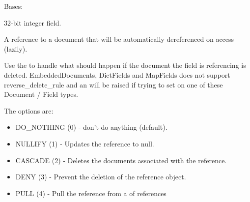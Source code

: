 \documentclass[letterpaper,10pt,english]{sphinxmanual}
\begin{document}
\begin{fulllineitems}
\label{\detokenize{questionnaire_response:questionnaire_response.QuestionnaireResponse}}
Bases: 

\begin{fulllineitems}
\label{\detokenize{questionnaire_response:questionnaire_response.QuestionnaireResponse.answer}}
32-bit integer field.

\end{fulllineitems}


\begin{fulllineitems}
\label{\detokenize{questionnaire_response:questionnaire_response.QuestionnaireResponse.questionnaire_item}}
A reference to a document that will be automatically dereferenced on
access (lazily).

Use the  to handle what should happen if the document
the field is referencing is deleted.  EmbeddedDocuments, DictFields and
MapFields does not support reverse\_delete\_rule and an 
will be raised if trying to set on one of these Document / Field types.

The options are:
\begin{itemize}
\item {} 
DO\_NOTHING (0)  - don't do anything (default).

\item {} 
NULLIFY    (1)  - Updates the reference to null.

\item {} 
CASCADE    (2)  - Deletes the documents associated with the reference.

\item {} 
DENY       (3)  - Prevent the deletion of the reference object.

\item {} 
PULL       (4)  - Pull the reference from a  of references

\end{itemize}


\end{fulllineitems}
\end{fulllineitems}
\end{document}
